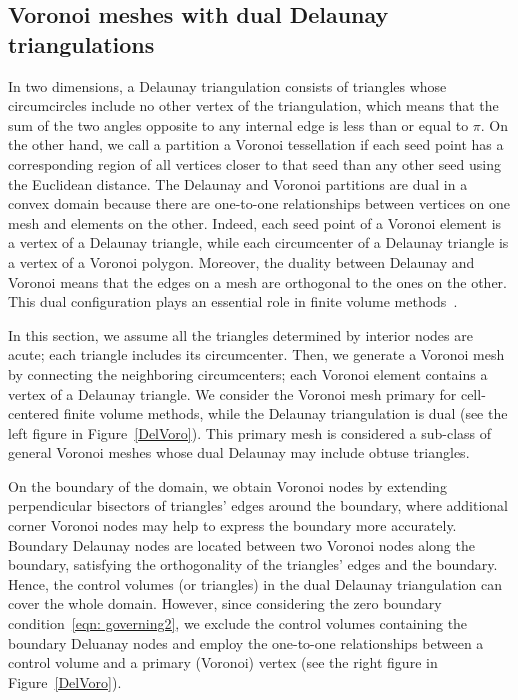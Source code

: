 \documentclass[a4paper]{article}
\theoremstyle{plain}
\theoremstyle{definition}
\numberwithin{equation}{section}
\begin{document}
\subsection{Voronoi meshes with dual Delaunay triangulations}
In two dimensions, a Delaunay triangulation consists of triangles whose circumcircles include no other vertex of the triangulation, which means that the sum of the two angles opposite to any internal edge is less than or equal to $\pi$.
On the other hand, we call a partition a Voronoi tessellation if each seed point has a corresponding region of all vertices closer to that seed than any other seed using the Euclidean distance.
The Delaunay and Voronoi partitions are dual in a convex domain because there are one-to-one relationships between vertices on one mesh and elements on the other. Indeed, each seed point of a Voronoi element is a vertex of a Delaunay triangle, while each circumcenter of a Delaunay triangle is a vertex of a Voronoi polygon.
Moreover, the duality between Delaunay and Voronoi means that the edges on a mesh are orthogonal to the ones on the other.
This dual configuration plays an essential role in finite volume methods~\cite{eymard2000finite}.


In this section, we assume all the triangles determined by interior nodes are acute; each triangle includes its circumcenter. Then, we generate a Voronoi mesh by connecting the neighboring circumcenters; each Voronoi element contains a vertex of a Delaunay triangle.
We consider the Voronoi mesh primary for cell-centered finite volume methods, while the Delaunay triangulation is dual (see the left figure in Figure~\ref{DelVoro}). This primary mesh is considered a sub-class of general Voronoi meshes whose dual Delaunay may include obtuse triangles.

On the boundary of the domain, we obtain Voronoi nodes by extending perpendicular bisectors of triangles' edges around the boundary, where additional corner Voronoi nodes may help to express the boundary more accurately.
Boundary Delaunay nodes are located between two Voronoi nodes along the boundary, satisfying the orthogonality of the triangles' edges and the boundary.
Hence, the control volumes (or triangles) in the dual Delaunay triangulation can cover the whole domain.
However, since considering the zero boundary condition~\eqref{eqn: governing2}, we exclude the control volumes containing the boundary Deluanay nodes and employ the one-to-one relationships between a control volume and a primary (Voronoi) vertex (see the right figure in Figure~\ref{DelVoro}).
\end{document}
